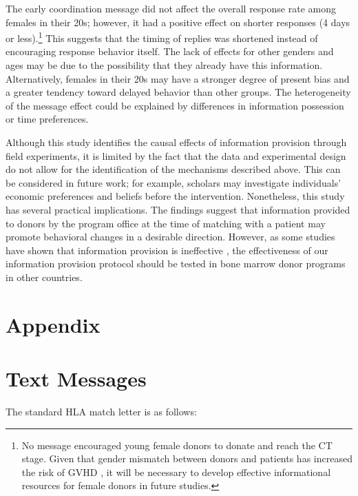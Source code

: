 \documentclass[12pt, a4paper]{article}
\begin{document}
The early coordination message did not affect the overall response rate among females in their 20s; however, it had a positive effect on shorter responses (4 days or less).\footnote{No message encouraged young female donors to donate and reach the CT stage. Given that gender mismatch between donors and patients has increased the risk of GVHD \citep{Loren2006, Nannya2011}, it will be necessary to develop effective informational resources for female donors in future studies.} This suggests that the timing of replies was shortened instead of encouraging response behavior itself. The lack of effects for other genders and ages may be due to the possibility that they already have this information. Alternatively, females in their 20s may have a stronger degree of present bias and a greater tendency toward delayed behavior than other groups. The heterogeneity of the message effect could be explained by differences in information possession or time preferences.

Although this study identifies the causal effects of information provision through field experiments, it is limited by the fact that the data and experimental design do not allow for the identification of the mechanisms described above. This can be considered in future work; for example, scholars may investigate individuals' economic preferences and beliefs before the intervention. Nonetheless, this study has several practical implications. The findings suggest that information provided to donors by the program office at the time of matching with a patient may promote behavioral changes in a desirable direction. However, as some studies have shown that information provision is ineffective \citep[for example,][]{Switzer2018}, the effectiveness of our information provision protocol should be tested in bone marrow donor programs in other countries.

\clearpage

\appendix

\hypertarget{appendix}{%
\section*{Appendix}\label{appendix}}

\hypertarget{message}{%
\section{Text Messages}\label{message}}

The standard HLA match letter is as follows:
\end{document}
